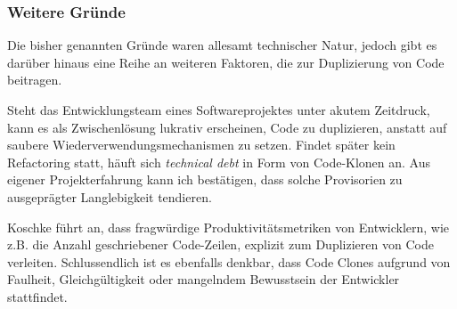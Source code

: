 \subsubsection{Weitere Gründe}

Die bisher genannten Gründe waren allesamt technischer Natur, jedoch gibt es darüber hinaus eine Reihe an weiteren Faktoren, die zur Duplizierung von Code beitragen.

Steht das Entwicklungsteam eines Softwareprojektes unter akutem Zeitdruck, kann es als Zwischenlösung lukrativ erscheinen, Code zu duplizieren, anstatt auf saubere Wiederverwendungsmechanismen zu setzen. Findet später kein Refactoring statt, häuft sich \textit{technical debt} in Form von Code-Klonen an. Aus eigener Projekterfahrung kann ich bestätigen, dass solche Provisorien zu ausgeprägter Langlebigkeit tendieren.

Koschke \cite{koschke2007survey} führt an, dass fragwürdige Produktivitätsmetriken von Entwicklern, wie z.B. die Anzahl geschriebener Code-Zeilen, explizit zum Duplizieren von Code verleiten. Schlussendlich ist es ebenfalls denkbar, dass Code Clones aufgrund von Faulheit, Gleichgültigkeit oder mangelndem Bewusstsein der Entwickler stattfindet.
